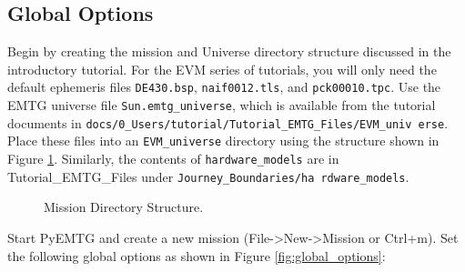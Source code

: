 \documentclass[11pt]{article}
\begin{document}
\subsection{Global Options}
\label{sec:global_options}

Begin by creating the mission and Universe directory structure discussed in the introductory tutorial. For the EVM series of tutorials, you will only need the default ephemeris files \texttt{DE430.bsp}, \texttt{naif0012.tls}, and \texttt{pck00010.tpc}. Use the \ac{EMTG} universe file \texttt{Sun.emtg\_universe}, which is available from the tutorial documents in \texttt{docs/0\_Users/tutorial/Tutorial\_EMTG\_Files/EVM\_univ erse}. Place these files into an \texttt{EVM\_universe} directory using the structure shown in Figure \ref{fig:mission_dir_structure}. Similarly, the contents of \texttt{hardware\_models} are in Tutorial\_EMTG\_Files under \texttt{Journey\_Boundaries/ha rdware\_models}.

\begin{figure}[H]
	\centering
	\caption{\label{fig:mission_dir_structure}Mission Directory Structure.}
\end{figure}

\noindent Start PyEMTG and create a new mission (File-\textgreater New-\textgreater Mission or Ctrl+m). Set the following global options as shown in Figure \ref{fig:global_options}:
\end{document}
